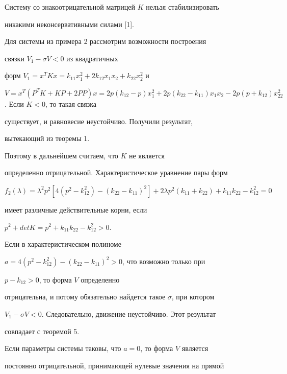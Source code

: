 \begin{cornonum}


Систему со знакоотрицательной матрицей $K$ нельзя стабилизировать


никакими неконсервативными силами [1].


\end{cornonum}





\begin{exam} Для системы из примера 2 рассмотрим возможности построения


связки $V_{1}-\sigma V<0$ из квадратичных


форм $ V_{1}=x^{T}Kx=k_{11}x_{1}^{2}+2k_{12}x_{1}x_{2}+k_{22}x_{2}^{2}$ и


$V=x^{T}(P^{T}K+KP+2PP)x=2p(k_{12}-p)x_{1}^{2}+2p(k_{22}-k_{11})x_{1}x_{2}-


2p(p+k_{12})x_{22}^{2}$. Если $K<0$, то такая связка


существует, и равновесие неустойчиво. Получили результат,


вытекающий из теоремы 1.


Поэтому в дальнейшем считаем, что $K$ не является


определенно отрицательной. Характеристическое уравнение пары форм


$$


f_{2}(\lambda )=\lambda ^{2}p^{2}[4(p^{2}-k_{12}^{2})-(k_{22}-k_{11})^{2}]+


2\lambda p^{2}(k_{11}+k_{22})+k_{11}k_{22}-k_{12}^{2}=0


$$


имеет различные действительные корни, если


$p^{2}+detK=p^{2}+k_{11}k_{22}-k_{12}^{2}> 0$.


Если в характеристическом полиноме


$a=4(p^{2}-k_{12}^{2})-(k_{22}-k_{11})^{2}>0$, что возможно только при


$p- k_{12}>0$, то форма $V$ определенно


отрицательна, и потому обязательно найдется такое $\sigma$, при котором


$V_{1}-\sigma V<0$. Следовательно, движение неустойчиво. Этот результат


совпадает с теоремой 5.


Если параметры системы таковы, что $a=0$, то форма $V$ является


постоянно отрицательной, принимающей нулевые значения на прямой



\end{exam}
